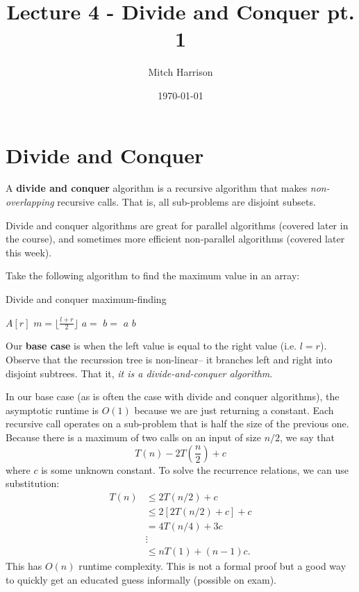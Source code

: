 \documentclass[titlepage, 12pt, leqno]{article}
\title{\Huge{Lecture 4 - Divide and Conquer pt. 1}}
\author{\large{Mitch Harrison}}
\date{\today}
\begin{document}
\setlength{\parskip}{1\baselineskip}
\setlength{\parindent}{15pt}
\maketitle
\tableofcontents
\newpage


\section{Divide and Conquer}

\begin{definition}
    A \textbf{divide and conquer} algorithm is a recursive algorithm that makes
    \textit{non-overlapping} recursive calls. That is, all sub-problems are
    disjoint subsets.
\end{definition}

Divide and conquer algorithms are great for parallel algorithms (covered later
in the course), and sometimes more efficient non-parallel algorithms (covered
later this week).

Take the following algorithm to find the maximum value in an array:
\begin{algorithm}
\caption{Divide and conquer maximum-finding}
\begin{algorithmic}
    \State \Return $A[r]$
    \Else
        \State $m = \lfloor \frac{l+r}{2} \rfloor$
        \State $a = $ 
        \State $b = $ 
            \State \Return $a$
        \Else
            \State \Return $b$
        \EndIf
    \EndIf
\EndProcedure 
\end{algorithmic}
\end{algorithm}

Our \textbf{base case} is when the left value is equal to the right value (i.e.
$l=r$). Observe that the recurssion tree is non-linear-- it branches left and
right into disjoint subtrees. That it, \textit{it is a divide-and-conquer
algorithm}.

In our base case (as is often the case with divide and conquer algorithms), the
asymptotic runtime is $O(1)$ because we are just returning a constant. Each
recursive call operates on a sub-problem that is half the size of the previous
one. Because there is a maximum of two calls on an input of size $n/2$, we
say that 
\[
T(n) - 2T\left(\frac{n}{2}\right) + c
\]
where $c$ is some unknown constant. To solve the recurrence relations, we can
use substitution:
\begin{align*}
    T(n) &\le 2T(n/2)+ c \\
         &\le 2[2T(n/2) + c] + c \\
         &= 4T(n/4) + 3c \\
         &\vdots\\
         &\le nT(1) + (n-1)c.
\end{align*}
This has $O(n)$ runtime complexity. This is not a formal proof but a good way
to quickly get an educated guess informally (possible on exam).
\end{document}
